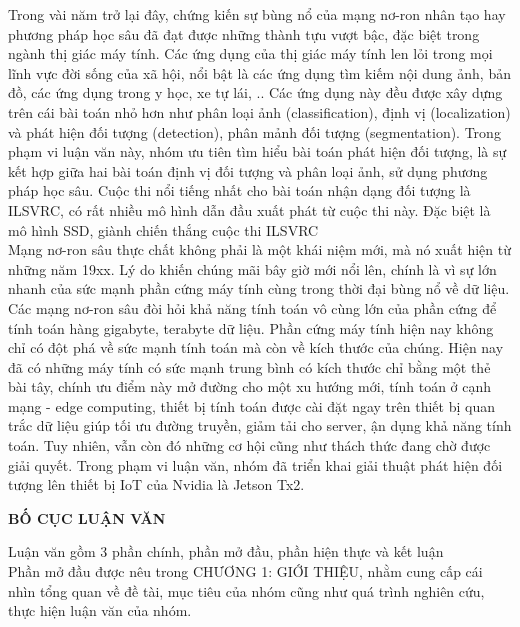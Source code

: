 \documentclass[a4paper]{report}
\begin{document}
Trong vài năm trở lại đây, chứng kiến sự bùng nổ của mạng nơ-ron nhân tạo hay phương pháp 
học sâu đã đạt được những thành tựu vượt bậc, đặc biệt trong ngành thị giác máy tính. Các 
ứng dụng của thị giác máy tính len lỏi trong mọi lĩnh vực đời sống của xã hội, nổi bật là 
các ứng dụng tìm kiếm nội dung ảnh, bản đồ, các ứng dụng trong y học, xe tự lái, .. Các ứng
 dụng này đều được xây dựng trên cái bài toán nhỏ hơn như phân loại ảnh (classification), 
 định vị (localization) và phát hiện đối tượng (detection), phân mảnh đối tượng 
 (segmentation).  Trong phạm vi luận văn này, nhóm ưu tiên tìm hiểu bài toán phát hiện
đối tượng, là sự kết hợp giữa hai bài toán định vị đối tượng và phân loại ảnh, sử dụng
phương pháp học sâu.  Cuộc thi nổi tiếng nhất cho bài toán nhận dạng đối tượng là ILSVRC, 
có rất nhiều mô hình dẫn đầu xuất phát từ cuộc thi này. Đặc biệt là mô hình SSD, giành 
chiến thắng cuộc thi ILSVRC \\

Mạng nơ-ron sâu thực chất không phải là một khái niệm mới, mà nó xuất hiện từ những
năm 19xx. Lý do khiến chúng mãi bây giờ mới nổi lên, chính là vì sự lớn nhanh của sức
mạnh phần cứng máy tính cùng trong thời đại bùng nổ về dữ liệu. Các mạng nơ-ron sâu 
đòi hỏi khả năng tính toán vô cùng lớn của phần cứng để tính toán hàng gigabyte,
terabyte dữ liệu. Phần cứng máy tính hiện nay không chỉ có đột phá về sức mạnh tính 
toán mà còn về kích thước của chúng. Hiện nay đã có những máy tính có sức mạnh trung
bình có kích thước chỉ bằng một thẻ bài tây, chính ưu điểm này mở đường cho một xu
hướng mới, tính toán ở cạnh mạng - edge computing, thiết bị tính toán được cài đặt
ngay trên thiết bị quan trắc dữ liệu giúp tối ưu đường truyền, giảm tải cho server,
ận dụng khả năng tính toán. Tuy nhiên, vẫn còn đó những cơ hội cũng như thách thức
đang chờ được giải quyết. Trong phạm vi luận văn, nhóm đã triển khai giải thuật 
phát hiện đối tượng lên thiết bị IoT của Nvidia là Jetson Tx2. 

\newpage
\begin{center}
	\textbf{BỐ CỤC LUẬN VĂN}
\end{center} 

Luận văn gồm 3 phần chính, phần mở đầu, phần hiện thực và kết luận \\

Phần mở đầu được nêu trong CHƯƠNG 1: GIỚI THIỆU, nhằm cung cấp cái nhìn tổng quan về đề tài,
 mục tiêu của nhóm cũng như quá trình nghiên cứu, thực hiện luận văn của nhóm.\\
\end{document}
